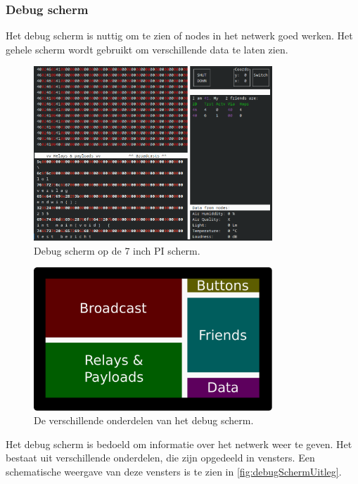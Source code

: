 \subsubsection*{Debug scherm}
Het debug scherm is nuttig om te zien of nodes in het netwerk goed werken. 
Het gehele scherm wordt gebruikt om verschillende data te laten zien. 
\begin{figure}[ht]
    \centering
    \includegraphics*[width=0.8\textwidth]{img/basestationInterface.png}
    \caption{Debug scherm op de 7 inch PI scherm.}
    \label{fig:debugSchermScreenshot}
\end{figure}

\begin{figure}[ht]
    \centering
    \includegraphics*[width=0.8\textwidth]{img/debugScreenExplain.pdf}
    \caption{De verschillende onderdelen van het debug scherm.}
    \label{fig:debugSchermUitleg}
\end{figure}
Het debug scherm is bedoeld om informatie over het netwerk weer te geven. Het bestaat uit verschillende onderdelen, die zijn opgedeeld in vensters. Een schematische weergave van deze vensters is te zien in \autoref{fig:debugSchermUitleg}.

